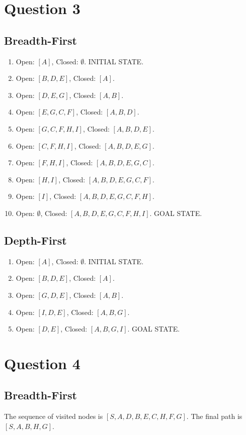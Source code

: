 \documentclass[12pt]{article}
\begin{document}
\section*{Question 3}
\subsection*{Breadth-First}
\begin{enumerate}
\item Open: $[A]$, Closed: $\emptyset$. INITIAL STATE.
\item Open: $[B, D, E]$, Closed: $[A]$.
\item Open: $[D, E, G]$, Closed: $[A, B]$.
\item Open: $[E, G, C, F]$, Closed: $[A, B, D]$.
\item Open: $[G, C, F, H, I]$, Closed: $[A, B, D, E]$.
\item Open: $[C, F, H, I]$, Closed: $[A, B, D, E, G]$.
\item Open: $[F, H, I]$, Closed: $[A, B, D, E, G, C]$.
\item Open: $[H, I]$, Closed: $[A, B, D, E, G, C, F]$.
\item Open: $[I]$, Closed: $[A, B, D, E, G, C, F, H]$.
\item Open: $\emptyset$, Closed: $[A, B, D, E, G, C, F, H, I]$. GOAL STATE.
\end{enumerate}

\subsection*{Depth-First}
\begin{enumerate}
\item Open: $[A]$, Closed: $\emptyset$. INITIAL STATE.
\item Open: $[B, D, E]$, Closed: $[A]$.
\item Open: $[G, D, E]$, Closed: $[A, B]$.
\item Open: $[I, D, E]$, Closed: $[A, B, G]$.
\item Open: $[D, E]$, Closed: $[A, B, G, I]$. GOAL STATE.
\end{enumerate}

\section*{Question 4}
\subsection*{Breadth-First}
The sequence of visited nodes is $[S, A, D, B, E, C, H, F, G]$. The final path is $[S, A, B, H, G]$.
\end{document}
